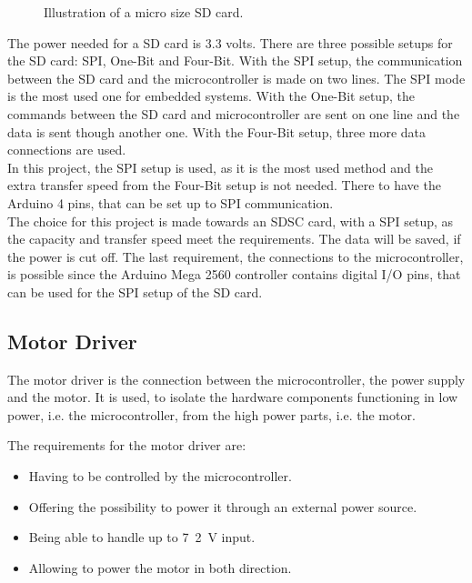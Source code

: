 \begin{minipage}{\linewidth}
\begin{minipage}{0.30\linewidth}
\begin{figure}[H]
              \caption{Illustration of a micro size SD card.} %
              \label{SDcardpinout}
          \end{figure}
      \end{minipage}
      
  \end{minipage}

The power needed for a SD card is 3.3 volts. There are three possible setups for the SD card: SPI, One-Bit and Four-Bit.
With the SPI setup, the communication between the SD card and the microcontroller is made on two lines. The SPI mode is the most used one for embedded systems.
With the One-Bit setup, the commands between the SD card and microcontroller are sent on one line and the data is sent though another one.
With the Four-Bit setup, three more data connections are used.\\
%
In this project, the SPI setup is used, as it is the most used method and the extra transfer speed from the Four-Bit setup is not needed. There to have the Arduino 4 pins, that can be set up to SPI communication.\\

The choice for this project is made towards an SDSC card, with a SPI setup, as the capacity and transfer speed meet the requirements. The data will be saved, if the power is cut off. The last requirement, the connections to the microcontroller, is possible since the Arduino Mega 2560 controller contains digital I/O pins, that can be used for the SPI setup of the SD card.



\subsection{Motor Driver}
The motor driver is the connection between the microcontroller, the power supply and the motor. It is used, to isolate the hardware components functioning in low power, i.e. the microcontroller, from the high power parts, i.e. the motor.

The requirements for the motor driver are:
\begin{itemize}
\item Having to be controlled by the microcontroller.
\item Offering the possibility to power it through an external power source.
\item Being able to handle up to \si{7.2 V} input. 
\item Allowing to power the motor in both direction.
\end{itemize}

